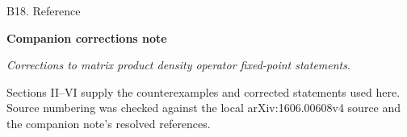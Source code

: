\documentclass[aspectratio=169,14pt]{beamer}
\begin{document}
\begin{frame}{B18. Reference}

\textbf{Companion corrections note}\par
\emph{Corrections to matrix product density operator fixed-point statements}.\par
Sections II--VI supply the counterexamples and corrected statements used here.
Source numbering was checked against the local arXiv:1606.00608v4 source and the companion note's resolved references.
\end{frame}
\end{document}
